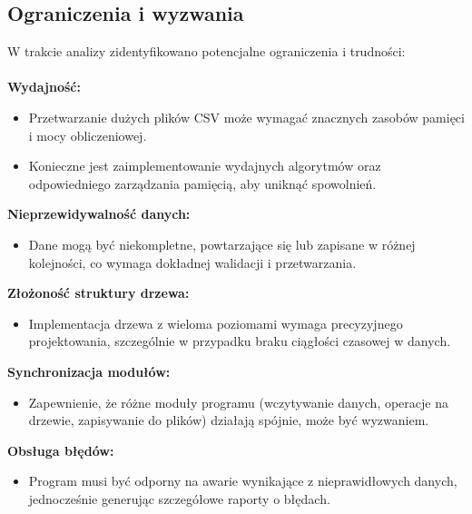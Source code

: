 \subsection{Ograniczenia i wyzwania}
W trakcie analizy zidentyfikowano potencjalne ograniczenia i trudności:
\\ \\
\textbf{Wydajność:}
\begin{itemize}
    \item Przetwarzanie dużych plików CSV może wymagać znacznych zasobów pamięci i mocy obliczeniowej.
    \item Konieczne jest zaimplementowanie wydajnych algorytmów oraz odpowiedniego zarządzania pamięcią, aby uniknąć spowolnień.
\end{itemize}
\textbf{Nieprzewidywalność danych:}
\begin{itemize}
    \item Dane mogą być niekompletne, powtarzające się lub zapisane w różnej kolejności, co wymaga dokładnej walidacji i przetwarzania.
\end{itemize}
\textbf{Złożoność struktury drzewa:}
\begin{itemize}
    \item Implementacja drzewa z wieloma poziomami wymaga precyzyjnego projektowania, szczególnie w przypadku braku ciągłości czasowej w danych.
\end{itemize}
\textbf{Synchronizacja modułów:}
\begin{itemize}
    \item Zapewnienie, że różne moduły programu (wczytywanie danych, operacje na drzewie, zapisywanie do plików) działają spójnie, może być wyzwaniem.
\end{itemize}
\textbf{Obsługa błędów:}
\begin{itemize}
    \item Program musi być odporny na awarie wynikające z nieprawidłowych danych, jednocześnie generując szczegółowe raporty o błędach.
\end{itemize}
\newpage
